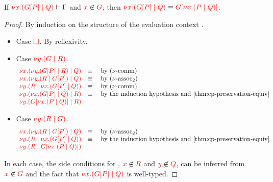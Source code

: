 \begin{lemmaB}\label{thm:cp-display-cut-1}
  If $\seq[{ \tm{\cpCut{x}{\cpPlug{G}{P}}{Q}} }]{ \Gamma }$ and
  $\notFreeIn{x}{G}$, then $\tm{\cpCut{x}{\cpPlug{G}{P}}{Q}} \equiv
  \tm{\cpPlug{G}{\cpCut{x}{P}{Q}}}$. 
\end{lemmaB}
  \begin{proof}
    By induction on the structure of the evaluation context .
    \begin{itemize}
    \item
      Case $\tm{\Box}$. By reflexivity.
    \item
      Case $\tm{\cpCut{y}{G}{R}}$.
      \[\!
        \begin{array}{ll}
          \tm{\cpCut{x}{\cpCut{y}{\cpPlug{G}{P}}{R}}{Q}} & \equiv \quad \text{by \cpEquivCutComm}\\
          \tm{\cpCut{x}{\cpCut{y}{R}{\cpPlug{G}{P}}}{Q}} & \equiv \quad \text{by \cpEquivCutAss2}\\
          \tm{\cpCut{y}{R}{\cpCut{x}{\cpPlug{G}{P}}{Q}}} & \equiv \quad \text{by \cpEquivCutComm}\\
          \tm{\cpCut{y}{\cpCut{x}{\cpPlug{G}{P}}{Q}}{R}} & \equiv \quad \text{by the induction hypothesis and \cref{thm:cp-preservation-equiv}}\\ 
          \tm{\cpCut{y}{\cpPlug{G}{\cpCut{x}{P}{Q}}}{R}} &
        \end{array}
      \]
    \item
      Case $\tm{\cpCut{y}{R}{G}}$.
      \[\!
        \begin{array}{ll}
          \tm{\cpCut{x}{\cpCut{y}{R}{\cpPlug{G}{P}}}{Q}} & \equiv \quad \text{by \cpEquivCutAss2}\\
          \tm{\cpCut{y}{R}{\cpCut{x}{\cpPlug{G}{P}}{Q}}} & \equiv \quad \text{by the induction hypothesis and \cref{thm:cp-preservation-equiv}}\\
          \tm{\cpCut{y}{R}{\cpPlug{G}{\cpCut{x}{P}{Q}}}}
        \end{array}
      \]
    \end{itemize}
    In each case, the side conditions for , $\notFreeIn{x}{R}$ and
    $\notFreeIn{y}{Q}$, can be inferred from $\notFreeIn{x}{G}$ and the fact that
    $\tm{\cpCut{x}{\cpPlug{G}{P}}{Q}}$ is well-typed.
  \end{proof}
